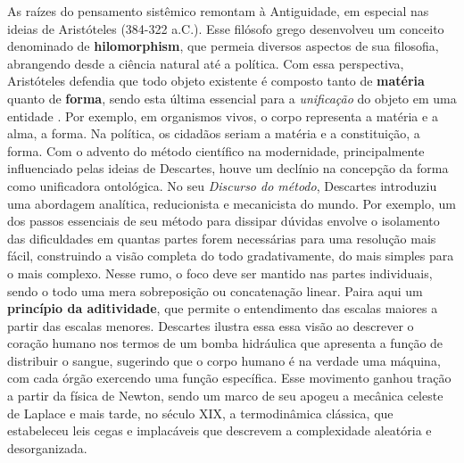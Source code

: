 \documentclass[./main.tex]{subfiles}
\begin{document}
\par As raízes do pensamento sistêmico remontam à Antiguidade, em especial nas ideias de Aristóteles (384-322 a.C.). Esse filósofo grego desenvolveu um conceito denominado de \textbf{\gls{hilomorphism}}, que permeia diversos aspectos de sua filosofia, abrangendo desde a ciência natural até a política. Com essa perspectiva, Aristóteles defendia que todo objeto existente é composto tanto de \textbf{matéria} quanto de \textbf{forma}, sendo esta última essencial para a \textit{unificação} do objeto em uma entidade \cite{Witt1987}. Por exemplo, em organismos vivos, o corpo representa a matéria e a alma, a forma. Na política, os cidadãos seriam a matéria e a constituição, a forma. Com o advento do método científico na modernidade, principalmente influenciado pelas ideias de Descartes, houve um declínio na concepção da forma como unificadora ontológica. No seu \textit{Discurso do método}, Descartes introduziu uma abordagem analítica, reducionista e mecanicista do mundo. Por exemplo, um dos passos essenciais de seu método para dissipar dúvidas envolve o isolamento das dificuldades em quantas partes forem necessárias para uma resolução mais fácil, construindo a visão completa do todo gradativamente, do mais simples para o mais complexo. Nesse rumo, o foco deve ser mantido nas partes individuais, sendo o todo uma mera sobreposição ou concatenação linear. Paira aqui um \textbf{princípio da aditividade}, que permite o entendimento das escalas maiores a partir das escalas menores. Descartes ilustra essa essa visão ao descrever o coração humano nos termos de um bomba hidráulica que apresenta a função de distribuir o sangue, sugerindo que o corpo humano é na verdade uma máquina, com cada órgão exercendo uma função específica. Esse movimento ganhou tração a partir da física de Newton, sendo um marco de seu apogeu a mecânica celeste de Laplace e mais tarde, no século XIX, a termodinâmica clássica, que estabeleceu leis cegas e implacáveis que descrevem a complexidade aleatória e desorganizada.
\end{document}
